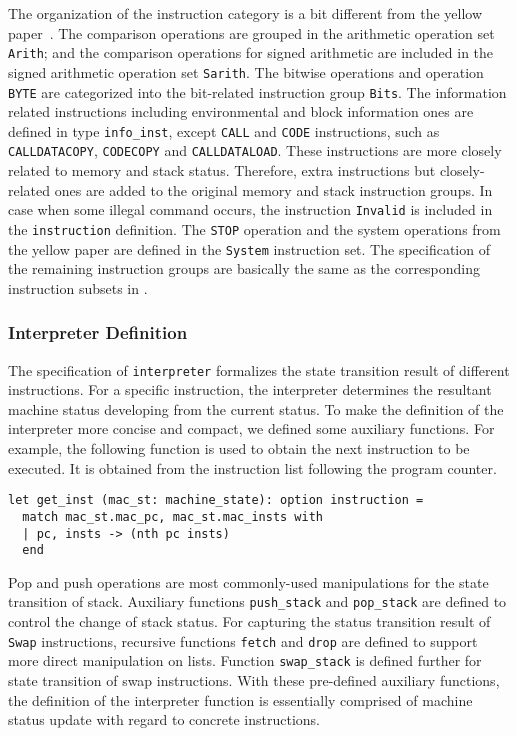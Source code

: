 \documentclass[runningheads]{llncs}
\begin{document}
The organization of the instruction category is a bit different from the yellow paper~\cite{wood2014ethereum}. The comparison operations are grouped in the arithmetic operation set \texttt{Arith}; and the comparison operations for signed arithmetic are included in the signed arithmetic operation set \texttt{Sarith}. The bitwise operations and operation \texttt{BYTE} are categorized into the bit-related instruction group \texttt{Bits}. The information related instructions including environmental and block information ones are defined in type \texttt{info\_inst}, except \texttt{CALL} and \texttt{CODE} instructions, such as \texttt{CALLDATACOPY}, \texttt{CODECOPY} and \texttt{CALLDATALOAD}. These instructions are more closely related to memory and stack status. Therefore, extra instructions but closely-related ones are added to the original memory and stack instruction groups. %
In case when some illegal command occurs, the instruction \texttt{Invalid} is included in the \texttt{instruction} definition. The \texttt{STOP} operation and the system operations from the yellow paper are defined in the \texttt{System} instruction set. The specification of the remaining instruction groups are basically the same as the corresponding instruction subsets in \cite{wood2014ethereum}. 

\subsubsection{Interpreter Definition}\label{sec:interpreter}
The specification of \texttt{interpreter} formalizes the state transition result of different instructions. For a specific instruction, the interpreter determines the resultant machine status developing from the current status.
To make the definition of the interpreter more concise and compact, we defined some auxiliary functions. For example, the following function is used to obtain the next instruction to be executed. It is obtained from the instruction list following the program counter. 
\begin{verbatim}
let get_inst (mac_st: machine_state): option instruction =
  match mac_st.mac_pc, mac_st.mac_insts with 
  | pc, insts -> (nth pc insts) 
  end    
\end{verbatim}

Pop and push operations are most commonly-used manipulations for the state transition of stack. Auxiliary functions \texttt{push\_stack} and \texttt{pop\_stack} are defined to control the change of stack status. For capturing the status transition result of \texttt{Swap} instructions, recursive functions \texttt{fetch} and \texttt{drop} are defined to support more direct manipulation on lists. Function \texttt{swap\_stack} is defined further for state transition of swap instructions.
With these pre-defined auxiliary functions, the definition of the interpreter function is essentially comprised of machine status update with regard to concrete instructions. 
\end{document}
